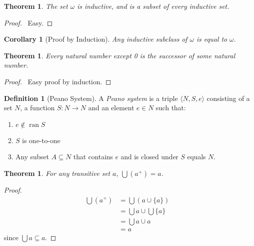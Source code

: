 \documentclass{article}
\let\qed\relax
\newtheorem{theorem}[axiom]{Theorem}
\newtheorem{corollary}{Corollary}[axiom]
\theoremstyle{definition}
\newtheorem{definition}[axiom]{Definition}
\newcommand{\ran}{\ensuremath{\operatorname{ran}}}
\begin{document}
    \begin{theorem}
        The set $\omega$ is inductive, and is a subset of every inductive set.
    \end{theorem}

    \begin{proof}
        \pf\ Easy. \qed
    \end{proof}

    \begin{corollary}[Proof by Induction]
        Any inductive subclass of $\omega$ is equal to $\omega$.
    \end{corollary}

    \begin{theorem}
        Every natural number except 0 is the successor of some natural number.
    \end{theorem}

    \begin{proof}
        \pf\ Easy proof by induction. \qed
    \end{proof}

    \begin{definition}[Peano System]
        A \emph{Peano system} is a triple $\langle N, S, e \rangle$ consisting of a set $N$,
        a function $S : N \rightarrow N$ and an element $e \in N$ such that:
        \begin{enumerate}
            \item $e \notin \ran S$
            \item $S$ is one-to-one
            \item Any subset $A \subseteq N$ that contains $e$ and is closed under $S$ equals $N$.
        \end{enumerate}
    \end{definition}

    \begin{theorem}
        \label{theorem:union_transitive_successor}
        For any transitive set $a$, $\bigcup (a^+) = a$.
    \end{theorem}

    \begin{proof}
        \pf
        \begin{align*}
            \bigcup (a^+) & = \bigcup (a \cup \{ a \}) \\
            & = \bigcup a \cup \bigcup \{a\} \\
            & = \bigcup a \cup a \\
            & = a
        \end{align*}
        since $\bigcup a \subseteq a$. \qed
    \end{proof}
\end{document}
